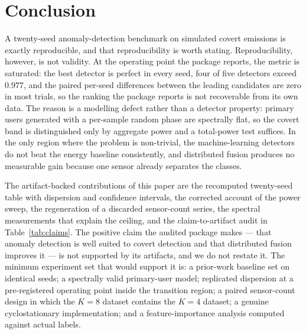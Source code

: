 \documentclass[conference]{IEEEtran}
\begin{document}
\section{Conclusion}
\label{sec:conclusion}

A twenty-seed anomaly-detection benchmark on simulated covert emissions is exactly reproducible, and that reproducibility is worth stating. Reproducibility, however, is not validity. At the operating point the package reports, the metric is saturated: the best detector is perfect in every seed, four of five detectors exceed $0.977$, and the paired per-seed differences between the leading candidates are zero in most trials, so the ranking the package reports is not recoverable from its own data. The reason is a modelling defect rather than a detector property: primary users generated with a per-sample random phase are spectrally flat, so the covert band is distinguished only by aggregate power and a total-power test suffices. In the only region where the problem is non-trivial, the machine-learning detectors do not beat the energy baseline consistently, and distributed fusion produces no measurable gain because one sensor already separates the classes.

The artifact-backed contributions of this paper are the recomputed twenty-seed table with dispersion and confidence intervals, the corrected account of the power sweep, the regeneration of a discarded sensor-count series, the spectral measurements that explain the ceiling, and the claim-to-artifact audit in Table~\ref{tab:claims}. The positive claim the audited package makes --- that anomaly detection is well suited to covert detection and that distributed fusion improves it --- is not supported by its artifacts, and we do not restate it. The minimum experiment set that would support it is: a prior-work baseline set on identical seeds; a spectrally valid primary-user model; replicated dispersion at a pre-registered operating point inside the transition region; a paired sensor-count design in which the $K=8$ dataset contains the $K=4$ dataset; a genuine cyclostationary implementation; and a feature-importance analysis computed against actual labels.
\end{document}
